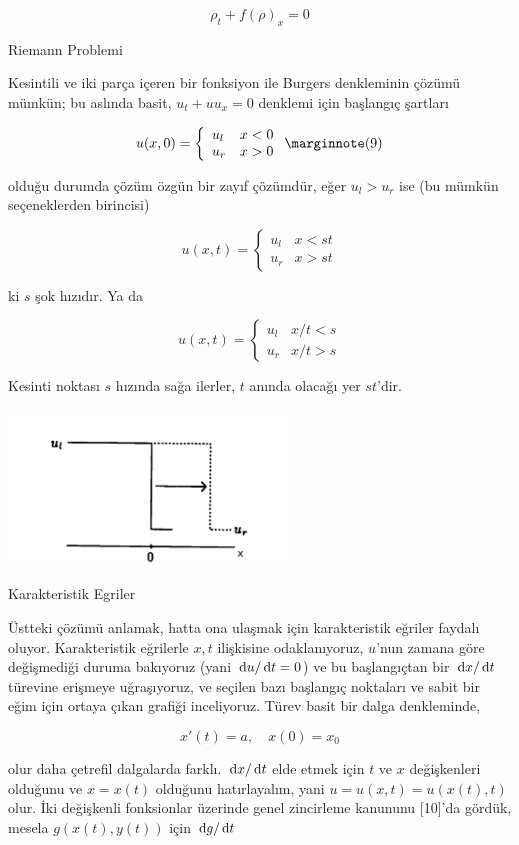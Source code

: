 \documentclass[12pt,fleqn]{article}\usepackage{../../common}
\begin{document}
$$
\rho_t + f(\rho)_x = 0
$$


Riemann Problemi

Kesintili ve iki parça içeren bir fonksiyon ile Burgers denkleminin çözümü
mümkün; bu aslında basit, $u_t + u u_x = 0$ denklemi için başlangıç şartları

$$
u(x,0) = 
\left\{ \begin{array}{ll}
u_l & x < 0 \\
u_r & x > 0 
\end{array} \right.
\mlabel{9}
$$

olduğu durumda çözüm özgün bir zayıf çözümdür, eğer $u_l > u_r$ ise (bu mümkün
seçeneklerden birincisi)

$$
u(x,t) = 
\left\{ \begin{array}{ll}
u_l & x < st \\
u_r & x > st 
\end{array} \right.
$$

ki $s$ şok hızıdır. Ya da

$$
u(x,t) = 
\left\{ \begin{array}{ll}
u_l & x/t < s \\
u_r & x/t > s 
\end{array} \right.
$$

Kesinti noktası $s$ hızında sağa ilerler, $t$ anında olacağı yer $st$'dir.

\includegraphics[width=20em]{compscieng_bpp50fv1_01.png}

Karakteristik Egriler

Üstteki çözümü anlamak, hatta ona ulaşmak için karakteristik eğriler faydalı
oluyor. Karakteristik eğrilerle $x,t$ ilişkisine odaklanıyoruz, $u$'nun zamana
göre değişmediği duruma bakıyoruz (yani $\,\mathrm{d} u / \,\mathrm{d} t = 0$) ve bu başlangıçtan
bir $\,\mathrm{d} x / \,\mathrm{d} t$ türevine erişmeye uğraşıyoruz, ve seçilen bazı başlangıç
noktaları ve sabit bir eğim için ortaya çıkan grafiği inceliyoruz. Türev basit
bir dalga denkleminde,

$$
x'(t) = a, \quad x(0) = x_0
$$

olur daha çetrefil dalgalarda farklı. $\,\mathrm{d} x / \,\mathrm{d} t$ elde etmek için $t$ ve $x$
değişkenleri olduğunu ve $x = x(t)$ olduğunu hatırlayalım, yani $u = u(x,t) =
u(x(t),t)$ olur. İki değişkenli fonksionlar üzerinde genel zincirleme kanununu
[10]'da gördük, mesela $g(x(t),y(t))$ için $\,\mathrm{d} g / \,\mathrm{d} t$
\end{document}
